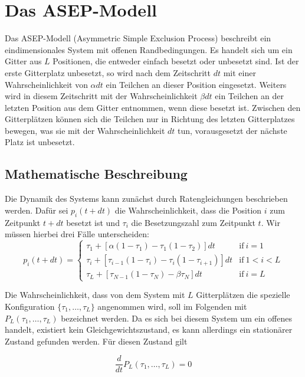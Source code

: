 \documentclass[10pt,a4paper]{report}
\begin{document}
\chapter{Das ASEP-Modell}
Das ASEP-Modell (Asymmetric Simple Exclusion Process) beschreibt ein eindimensionales System mit offenen Randbedingungen. Es handelt sich um ein Gitter aus $L$ Positionen, die entweder einfach besetzt oder unbesetzt sind. Ist der erste Gitterplatz unbesetzt, so wird nach dem Zeitschritt $dt$ mit einer Wahrscheinlichkeit von $\alpha dt$ ein Teilchen an dieser Position eingesetzt. Weiters wird in diesem Zeitschritt mit der Wahrscheinlichkeit $\beta dt$ ein Teilchen an der letzten Position aus dem Gitter entnommen, wenn diese besetzt ist. Zwischen den Gitterplätzen können sich die Teilchen nur in Richtung des letzten Gitterplatzes bewegen, was sie mit der Wahrscheinlichkeit $dt$ tun, vorausgesetzt der nächste Platz ist unbesetzt.\\

\section{Mathematische Beschreibung}
Die Dynamik des Systems kann zunächst durch Ratengleichungen beschrieben werden. Dafür sei $p_i(t+dt)$ die Wahrscheinlichkeit, dass die Position $i$ zum Zeitpunkt $t+dt$ besetzt ist und $\tau_i$ die Besetzungszahl zum Zeitpunkt $t$. Wir müssen hierbei drei Fälle unterscheiden:
\begin{equation}
p_i(t+dt)=
\begin{cases}
\tau_1+[\alpha(1-\tau_1)-\tau_1(1-\tau_2)]dt & \text{if}\ i=1\\
\tau_i+[\tau_{i-1}(1-\tau_i)-\tau_i(1-\tau_{i+1})]dt & \text{if}\ 1<i<L\\
\tau_L+[\tau_{N-1}(1-\tau_N)-\beta\tau_N]dt & \text{if}\ i=L
\end{cases}
\end{equation}

Die Wahrscheinlichkeit, dass von dem System mit $L$ Gitterplätzen die spezielle Konfiguration $\{ \tau_1,\ldots,\tau_L \}$ angenommen wird, soll im Folgenden mit $P_L(\tau_1,\ldots,\tau_L)$ bezeichnet werden. Da es sich bei diesem System um ein offenes handelt, existiert kein Gleichgewichtszustand, es kann allerdings ein stationärer Zustand gefunden werden. Für diesen Zustand gilt

\begin{equation}
\frac{d}{dt}P_L(\tau_1,\ldots,\tau_L)=0
\end{equation}
\end{document}
